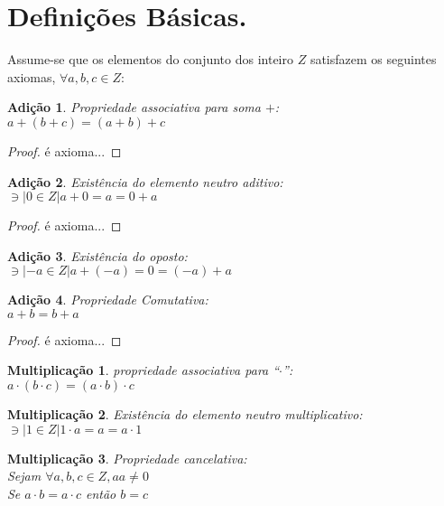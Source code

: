 \documentclass[a4paper,12pt]{article}
\newtheorem{add}{Adição}
\newtheorem{mult}{Multiplicação}
\begin{document}
\section{Definições Básicas.}

Assume-se que os elementos do conjunto dos inteiro $Z$ satisfazem os seguintes axiomas, $\forall a, b, c \in Z$:

\begin{add} %
  Propriedade associativa para soma $+$:\\
  $a + (b + c) = (a + b) + c$
\end{add}
\begin{proof}
  é axioma...
\end{proof}

\begin{add} %
  Existência do elemento neutro aditivo:\\
  $\ni |0 \in Z| a + 0 = a = 0 + a$ %
\end{add}
\begin{proof}
  é axioma...
\end{proof}

\begin{add} %
  Existência do oposto:\\
  $\ni |-a \in Z| a + (-a) = 0 = (-a) + a$ %
\end{add}

\begin{add} %
  Propriedade Comutativa:\\
  $a + b = b + a$ %
\end{add}
\begin{proof}
  é axioma...
\end{proof}

\begin{mult} %
  propriedade associativa para ``$\cdot$'':\\
  $a \cdot (b \cdot c) =  (a \cdot b) \cdot c$
\end{mult}

\begin{mult} %
  Existência do elemento neutro multiplicativo:\\
  $\ni |1 \in Z| 1 \cdot a = a = a \cdot 1$ %
\end{mult}

\begin{mult} %
  Propriedade cancelativa:\\
  Sejam $\forall a, b, c \in Z, a a \neq 0$\\
  Se $a \cdot b = a \cdot c$ então $b = c$
\end{mult}
\end{document}
